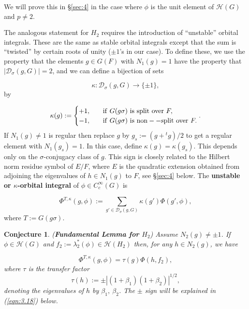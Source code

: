 \documentclass[12pt,letterpaper]{amsart}
\numberwithin{equation}{section}
\newtheorem{conjecture}[theorem]{Conjecture}
\theoremstyle{definition}
\theoremstyle{plain}
\providecommand{\cal}{\mathcal}
\def\hhh{{\cal H}}
\def\ddd{{\cal D}}
\begin{document}
We will prove this in \S \ref{sec:4} 
in the case where $\phi$ is the unit element
of $\hhh (G)$ and $p\not= 2$.
 
The analogous statement for $H_2$ requires the introduction
of ``unstable'' orbital integrals. These are the same as stable orbital
integrals except that the sum is ``twisted'' by certain roots of unity
($\pm 1$'s in our case). To define these, we use the property that
the elements $g \in G(F)$ with $N_1(g) = 1$ have the property
that $|\ddd_{\sigma}(g,G)|=2$, and we can define a bijection of sets

\begin{equation}
\label{eqn:1.25}
\kappa : \ddd_{\sigma}(g,G) \rightarrow \{\pm 1\},
\end{equation}
by

\[
\kappa (g) := 
\begin{cases} 
+1,&\ \ \ {\rm if}\ G(g\sigma)\ {\rm is\ split\ over}\ F,\\
-1,&\ \ \ {\rm if}\ G(g\sigma)\ {\rm is\ non--split\ over}\ F .
\end{cases}.
\]
If $N_1(g) \not= 1$ is regular then replace $g$ by $g_{s} :=
(g+{^{t}g})/2$ to get a regular element with $N_1(g_{s})=1$. In this
case, define $\kappa (g) = \kappa (g_{s})$. This depends only
on the $\sigma$-conjugacy class of $g$. This sign is closely related
to the Hilbert norm residue symbol of $E/F$, where $E$ is the quadratic
extension obtained from adjoining the eigenvalues of $h \in N_1(g)$ to
$F$, see \S \ref{sec:4} below. 
The {\bf unstable or $\kappa$-orbital integral}
of $\phi \in C^\infty_c(G)$ is

\begin{equation}
\label{eqn:1.26}
\Phi^{T,\kappa}(g,\phi ):= \sum_{g' \in \ddd_{\sigma}(g,G)} 
\kappa (g')\Phi (g',\phi ),
\end{equation}
where $T:=G(g\sigma )$.

\begin{conjecture}
({\bf Fundamental Lemma for $H_2$})
Assume $N_2(g) \not= 
\pm 1$. If $\phi \in \hhh (G)$ and $f_2:=\lambda_2^*(\phi ) \in
\hhh (H_2)$ then, for any $h \in N_2(g)$, we have

\begin{equation}
\label{eqn:1.27}
\Phi^{T,\kappa}(g,\phi ) = \tau (g)\Phi(h,f_2),
\end{equation}
where $\tau$ is the transfer factor
\[
\tau (h) := \pm |(1+\beta_{1})(1+\beta_{2})|^{1/2},
\]
denoting the eigenvalues of $h$ by $\beta_{1},\ \beta_{2}$. The $\pm$ sign
will be explained in (\ref{eqn:3.18}) below.
\end{conjecture}
 
\end{document}
